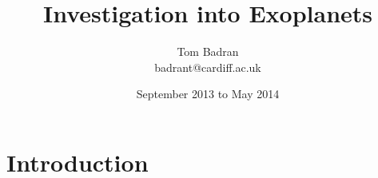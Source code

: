 \documentclass[a4paper]{article}
\title{Investigation into Exoplanets}
\author{Tom Badran \\ badrant@cardiff.ac.uk}
\date{September 2013 to May 2014}
\numberwithin{equation}{section}
\begin{document}
\maketitle

\abstract


\section{Introduction}


%
%
\end{document}
